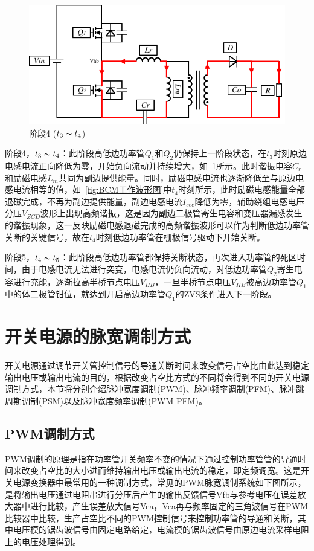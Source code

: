 \begin{figure}[htbp] 
    \centering
    \includegraphics[width=0.6\linewidth]{figures/工作原理4.pdf}
    \caption{阶段4 ($t_3 \thicksim t_4$)}
    \label{fig:工作原理4}
\end{figure}

阶段4，$t_3 \thicksim t_4$：此阶段高低边功率管$Q_1$和$Q_2$仍保持上一阶段状态，在$t_3$时刻原边电感电流正向降低为零，开始负向流动并持续增大，如~\ref{fig:工作原理4}所示。此时谐振电容$C_r$和励磁电感$L_m$共同为副边提供能量。同时，励磁电感电流也逐渐降低至与原边电感电流相等的值，如~\ref{fig:BCM工作波形图}中$t_4$时刻所示，此时励磁电感能量全部退磁完成，不再为副边提供能量，副边电感电流$I_{sec}$降低为零，辅助绕组电感电压分压$V_{ZCD}$波形上出现高频谐振，这是因为副边二极管寄生电容和变压器漏感发生的谐振现象，这一反映励磁电感退磁完成的高频谐振波形可以作为判断低边功率管关断的关键信号，故在$t_4$时刻低边功率管在栅极信号驱动下开始关断。


                
阶段5，$t_4 \thicksim t_5$：此阶段高低边功率管都保持关断状态，再次进入功率管的死区时间，由于电感电流无法进行突变，电感电流仍负向流动，对低边功率管$Q_2$寄生电容进行充能，逐渐拉高半桥节点电压$V_{HB}$，一旦半桥节点电压$V_{HB}$被高边功率管$Q_1$中的体二极管钳位，就达到开启高边功率管$Q_1$的ZVS条件进入下一阶段。

								


\section{开关电源的脉宽调制方式}
开关电源通过调节开关管控制信号的导通关断时间来改变信号占空比由此达到稳定输出电压或输出电流的目的，根据改变占空比方式的不同将会得到不同的开关电源调制方式，本节将分别介绍脉冲宽度调制(PWM)、脉冲频率调制(PFM)、脉冲跳周期调制(PSM)以及脉冲宽度频率调制(PWM-PFM)。

\subsection{PWM调制方式}
PWM调制的原理是指在功率管开关频率不变的情况下通过控制功率管管的导通时间来改变占空比的大小进而维持输出电压或输出电流的稳定，即定频调宽。这是开关电源变换器中最常用的一种调制方式，常见的PWM脉宽调制系统如下图所示，是将输出电压通过电阻串进行分压后产生的输出反馈信号Vfb与参考电压在误差放大器中进行比较，产生误差放大信号Vea，Vea再与频率固定的三角波信号在PWM比较器中比较，生产占空比不同的PWM控制信号来控制功率管的导通和关断，其中电压模的锯齿波信号由固定电路给定，电流模的锯齿波信号由原边电流采样电阻上的电压处理得到。

